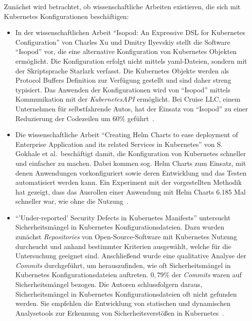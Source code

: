 Zunächst wird betrachtet, ob wissenschaftliche Arbeiten existieren, die sich mit Kubernetes Konfigurationen beschäftigen:
\begin{itemize}
    \item In der wissenschaftlichen Arbeit ``Isopod: An Expressive DSL for Kubernetes Configuration'' von Charles Xu und Dmitry Ilyevskiy stellt die
          Software ``Isopod'' vor, die eine alternative Konfiguration von Kubernetes Objekten ermöglicht. Die Konfiguration erfolgt nicht mittels \ac{yaml}-Dateien,
          sondern mit der Skriptsprache Starlark verfasst. Die Kubernetes Objekte werden als Protocol Buffers Definition zur Verfügung gestellt und sind daher streng typisiert.
          Das Anwenden der Konfigurationen wird von ``Isopod'' mittels Kommunikation mit der \textit{KubernetesAPI} ermöglicht.
          Bei Cruise LLC, einem Unternehmen für selbstfahrende Autos, hat der Einsatz von ``Isopod'' zu einer Reduzierung der Codezeilen um $60\%$ geführt~\cite{10.1145/3357223.3365759}.
    \item Die wissenschaftliche Arbeit ``Creating Helm Charts to ease deployment of Enterprise Application and its related Services in Kubernetes'' von
          S. Gokhale et al.\ beschäftigt damit, die Konfiguration von Kubernetes schneller und einfacher zu machen. Dabei kommen sog. Helm Charts zum Einsatz,
          mit denen Anwendungen vorkonfiguriert sowie deren Entwicklung und das Testen automatisiert werden kann. Ein Experiment mit der vorgestellten Methodik
          hat gezeigt, dass das Ausrollen einer Anwendung mit Helm Charts 6.185 Mal schneller war, wie ohne die Nutzung~\cite{9776450}.
    \item ``'Under-reported' Security Defects in Kubernetes Manifests'' untersucht Sicherheitsmängel in Kubernetes Konfigurationsdateien.
          Dazu wurden zunächst \textit{Repositories} von Open-Source-Software mit Kubernetes Nutzung durchsucht und anhand bestimmter Kriterien ausgewählt, welche für
          die Untersuchung geeignet sind. Anschließend wurde eine qualitative Analyse der \textit{Commits} durchgeführt, um herauszufinden, wie oft Sicherheitsmängel in Kubernetes
          Konfigurationsdateien auftreten. $0,79\%$ der \textit{Commits} waren auf Sicherheitsmängel bezogen. Die Autoren schlussfolgern daraus,
          Sicherheitsmängel in Kubernetes Konfigurationsdateien oft nicht gefunden werden. Sie empfehlen die Entwicklung von statischen und dynamischen Analysetools
          zur Erkennung von Sicherheitsverstößen in Kubernetes~\cite{9476056}.
\end{itemize}

